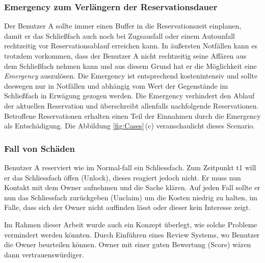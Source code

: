 \subsubsection{Emergency zum Verlängern der Reservationsdauer}
Der Benutzer A sollte immer einen Buffer in die Reservationszeit einplanen, damit er das Schließfach auch noch bei Zugsausfall oder einem Autounfall rechtzeitig vor Reservationsablauf erreichen kann. In äußersten Notfällen kann es trotzdem vorkommen, dass der Benutzer A nicht rechtzeitig seine Affären aus dem Schließfach nehmen kann und aus diesem Grund hat er die Möglichkeit eine \emph{Emergency} auszulösen. Die Emergency ist entsprechend kostenintensiv und sollte deswegen nur in Notfällen und abhängig vom Wert der Gegenstände im Schließfach in Erwägung gezogen werden. 
Die Emergency verhindert den Ablauf der aktuellen Reservation und überschreibt allenfalls nachfolgende Reservationen. Betroffene Reservationen erhalten einen Teil der Einnahmen durch die Emergency als Entschädigung. Die Abbildung \ref{fig:Cases}\,(c) veranschaulicht dieses Scenario.

\subsubsection{Fall von Schäden}
Benutzer A reserviert wie im Normal-fall ein Schliessfach. Zum Zeitpunkt t1 will er das Schliessfach öffen (Unlock), dieses reagiert jedoch nicht. Er muss nun Kontakt mit dem Owner aufnehmen und die Sache klären. Auf jeden Fall sollte er nun das Schliessfach zurückgeben (Unclaim) um die Kosten niedrig zu halten, im Falle, dass sich der Owner nicht auffinden lässt oder dieser kein Interesse zeigt.

Im Rahmen dieser Arbeit wurde auch ein Konzept überlegt, wie solche Probleme vermindert werden könnten. Durch Einführen eines Review Systems, wo Benutzer die Owner beurteilen können. Owner mit einer guten Bewertung (Score) wären dann vertrauenswürdiger.


